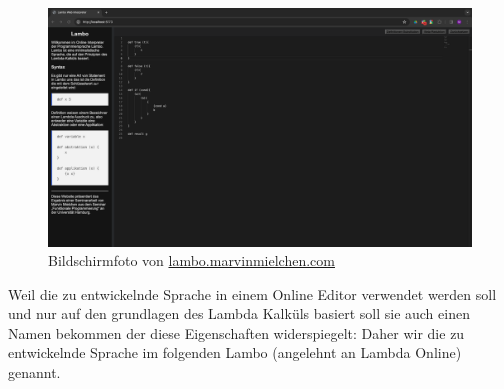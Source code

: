 \documentclass[ngerman]{article}
\begin{document}
\begin{figure}
    \centering
    \includegraphics[width=1\textwidth]{screenshot.png}
    \caption{Bildschirmfoto von \href{https://lambo.marvinmielchen.com}{lambo.marvinmielchen.com}}
    \label{fig:lambowebsite}
\end{figure}

Weil die zu entwickelnde Sprache in einem Online Editor verwendet werden soll und nur auf den grundlagen des Lambda Kalküls basiert soll sie auch einen Namen bekommen der diese Eigenschaften widerspiegelt:
Daher wir die zu entwickelnde Sprache im folgenden Lambo (angelehnt an Lambda Online) genannt.
\end{document}
